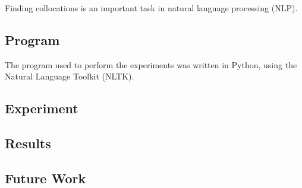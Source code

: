 Finding collocations is an important task in natural language processing (NLP).

\subsection*{Program}

The program used to perform the experiments was written in Python, using the
Natural Language Toolkit (NLTK)\cite{nltk}.

\subsection*{Experiment}
\subsection*{Results}
\subsection*{Future Work}

%	
%
%
%
%
%





